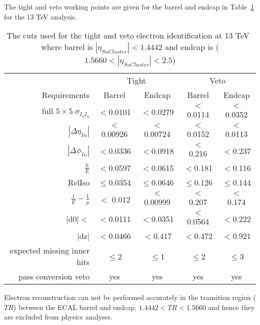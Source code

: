 The tight and veto working points are given for the barrel and endcap in Table~\ref{tab:electron_tight_cuts13} for the 13 TeV analysis. 

\begin{table}[htpb!]
\footnotesize
\begin{center}
\begin{tabular}{|r|c|c|c|c|}
\hline
& \multicolumn{2}{c|}{Tight} & \multicolumn{2}{c|}{Veto} \\
\cline{2-5}
Requirements &  Barrel        &   Endcap  &  Barrel        &   Endcap  \\
\hline
full $5\times5 \; \sigma_{I_{\eta}I_{\eta}} $ & $ <$0.0101 & $ <$0.0279 & $ <$0.0114 & $ <$0.0352\\
$|\Delta \eta_{In}| $  & $ <$0.00926 &$ <$ 0.00724  & $ <$0.0152 & $ <$0.0113  \\
$|\Delta \phi_{In}|  $  &  $<$0.0336 & $<$0.0918 & $<$ 0.216 & $<$0.237  \\
$\frac{h}{E} $ &$<$0.0597 & $<$0.0615  &$<$0.181 & $<$0.116  \\
RelIso & $\leq$0.0354 & $\leq$0.0646& $\leq$0.126 & $\leq$0.144\\
$\frac{1}{E} - \frac{1}{p}  $ & $<$ 0.012 & $<$ 0.00999  & $<$ 0.207 & $<$ 0.174 \\
$|$d$0| < $  & $<$0.0111 & $<$0.0351  & $<$0.0564 & $<$0.222\\
$|$dz$| $  & $<$0.0466 & $<$0.417 & $<$0.472 & $<$0.921\\
expected missing inner hits  & $\leq$2 & $\leq$1 & $\leq$2 & $\leq$3  \\
pass conversion veto & yes & yes& yes & yes  \\
\hline
\end{tabular}
\caption{The cuts used for the tight and veto electron identification at 13 TeV~\cite{electronID} where barrel is $|\eta_{SuCluster}|< 1.4442$ and endcap is  ($1.5660<|\eta_{SuCluster}|<2.5$)}
\label{tab:electron_tight_cuts13}
\end{center}
\end{table}

Electron reconstruction can not be performed accurately in the transition region ($TR$) between the ECAL barrel and endcap, $1.4442<TR<1.5660$ and hence they are excluded from physics analyses.

